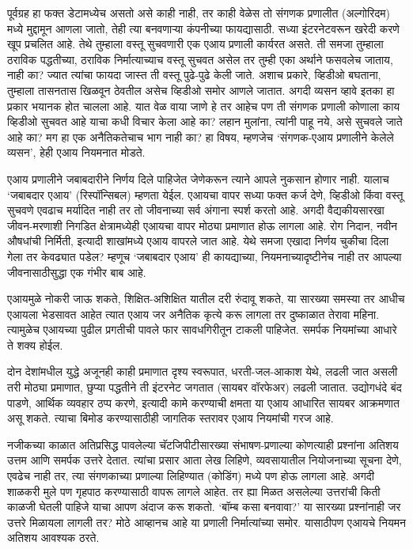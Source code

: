 पूर्वग्रह हा फक्त डेटामध्येच असतो असे काही नाही, तर काही वेळेस तो संगणक प्रणालीत (अल्गोरिदम) मध्ये मुद्दामून आणला जातो, तेही त्या बनवणाऱ्या कंपनीच्या फायद्यासाठी. सध्या इंटरनेटवरून खरेदी करणे खूप प्रचलित आहे. तेथे तुम्हाला वस्तू सुचवणारी एक एआय प्रणाली कार्यरत असते. ती समजा तुम्हाला ठराविक पद्धतीच्या, ठराविक निर्मात्याच्याच वस्तू सुचवत असेल तर तुम्ही एका अर्थाने फसवलेच जाताय, नाही का? ज्यात त्यांचा फायदा जास्त ती वस्तू पुढे-पुढे केली जाते. अशाच  प्रकारे, व्हिडीओ बघताना, तुम्हाला तासनतास खिळवून ठेवतील असेच व्हिडीओ समोर आणले जातात. अगदी व्यसन व्हावे इतका हा प्रकार भयानक होत चालला आहे. यात वेळ वाया जाणे हे तर आहेच पण ती संगणक प्रणाली कोणाला काय व्हिडीओ  सुचवत आहे याचा कधी विचार केला आहे का? लहान मुलांना, त्यांनी पाहू नये, असे सुचवले जाते आहे का? मग हा एक अनैतिकतेचाच भाग नाही का? हा विषय, म्हणजेच `संगणक-एआय प्रणालीने केलेले व्यसन', हेही एआय नियमनात मोडते.

एआय प्रणालीने जबाबदारीने निर्णय दिले पाहिजेत जेणेकरून त्याने आपले नुकसान होणार नाही. यालाच `जबाबदार एआय' (रिस्पॉन्सिबल)  म्हणता येईल. एआयचा वापर सध्या फक्त कर्ज देणे, व्हिडीओ किंवा वस्तू सुचवणे एवढाच मर्यादित नाही तर तो जीवनाच्या सर्व अंगाना स्पर्श करतो आहे. अगदी वैद्यकीयसारखा जीवन-मरणाशी निगडित क्षेत्रामध्येही एआयचा वापर मोठ्या प्रमाणात होऊ लागला आहे. रोग निदान, नवीन औषधांची निर्मिती, इत्यादी शाखांमध्ये एआय वापरले जात आहे. येथे समजा एखादा निर्णय चुकीचा दिला गेला तर केवढ्यात पडेल? म्हणूच `जबाबदार एआय' ही कायद्याच्या, नियमनाच्यादृष्टीनेच नाही तर आपल्या जीवनासाठीसुद्धा एक गंभीर बाब आहे.

एआयमुळे नोकरी जाऊ शकते, शिक्षित-अशिक्षित यातील दरी रुंदावू शकते, या सारख्या समस्या तर आधीच एआयला भेडसावत आहेत त्यात एआय जर अनैतिक कृत्ये करू लागला तर दुष्काळात तेरावा महिना. त्यामुळेच एआयच्या पुढील प्रगतीची पावले फार सावधगिरीतून टाकली पाहिजेत. समर्पक नियमांच्या आधारे ते शक्य होईल.

दोन देशांमधील युद्धे अजूनही काही प्रमाणात दृश्य स्वरूपात, धरती-जल-आकाश येथे, लढली जात असली तरी मोठ्या प्रमाणात, छुप्या पद्धतीने ती इंटरनेट जगतात (सायबर वॉरफेअर) लढली जातात. उद्योगधंदे बंद पाडणे, आर्थिक व्यवहार ठप्प करणे, इत्यादी कामे करण्याची क्षमता या एआय आधारित सायबर आक्रमणात असू शकते. त्याचा बिमोड करण्यासाठीही जागतिक स्तरावर एआय नियमांची गरज आहे.

नजीकच्या काळात अतिप्रसिद्ध पावलेल्या चॅटजिपीटीसारख्या संभाषण-प्रणाल्या कोणत्याही प्रश्नांना अतिशय उत्तम आणि समर्पक उत्तरे देतात. त्यांचा प्रसार आता लेख लिहिणे, व्यवसायातील नियोजनाच्या सूचना देणे, एवढेच नाही तर, त्या संगणकाच्या प्रणाल्या लिहिण्यात (कोडिंग) मध्ये पण होऊ लागला आहे. अगदी शाळकरी मुले पण गृहपाठ करण्यासाठी वापरू लागले आहेत. तर ह्या मिळत असलेल्या उत्तरांची किती काळजी घेतली पाहिजे याचा आपण अंदाज करू शकतो. `बॉम्ब कसा बनवावा?' या सारख्या प्रश्नांनाही जर उत्तरे मिळायला लागली तर? मोठे आव्हानच आहे या प्रणाली निर्मात्यांच्या समोर. यासाठीपण एआयचे नियमन अतिशय आवश्यक ठरते.

